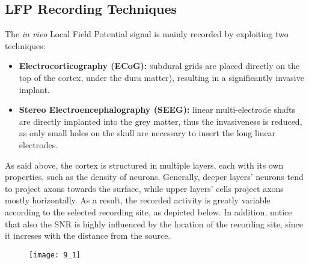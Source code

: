 \subsection{LFP Recording Techniques}
The \textit{in vivo} Local Field Potential signal is mainly recorded by exploiting
two techniques:
\begin{itemize}
    \item \textbf{Electrocorticography (ECoG):} subdural grids are placed directly on
    the top of the cortex, under the dura matter), resulting in a significantly
    invasive implant.
    \item \textbf{Stereo Electroencephalography (SEEG):} linear multi-electrode shafts
    are directly implanted into the grey matter, thus the invasiveness is reduced,
    as only small holes on the skull are necessary to insert the long linear electrodes.
\end{itemize}
As said above, the cortex is structured in multiple layers, each with its own
properties, such as the density of neurons. Generally, deeper layers' neurons
tend to project axons towards the surface, while upper layers' cells project axons
mostly horizontally. As a result, the recorded activity is greatly variable according
to the selected recording site, as depicted below. In addition, notice that also the
SNR is highly influenced by the location of the recording site, since it increses
with the distance from the source.
\begin{figure}[H]
    \texttt{[image: 9\_1]}
    \centering
\end{figure}
